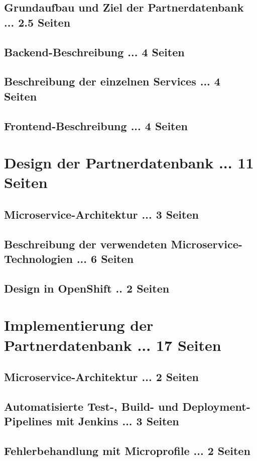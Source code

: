 \documentclass[master,german]{hgbthesis}
\begin{document}
\section{Grundaufbau und Ziel der Partnerdatenbank ... 2.5 Seiten}
\section{Backend-Beschreibung ... 4 Seiten}
\section{Beschreibung der einzelnen Services ... 4 Seiten}
\section{Frontend-Beschreibung ... 4 Seiten}

\chapter{Design der Partnerdatenbank ... 11 Seiten}
\section{Microservice-Architektur ... 3 Seiten}
\section{Beschreibung der verwendeten Microservice-Technologien ... 6 Seiten}
\section{Design in OpenShift .. 2 Seiten}


\chapter{Implementierung der Partnerdatenbank ... 17 Seiten}
\section{Microservice-Architektur ... 2 Seiten}
\section{Automatisierte Test-, Build- und Deployment-Pipelines mit Jenkins ... 3 Seiten}
\section{Fehlerbehandlung mit Microprofile ... 2 Seiten}
\end{document}
